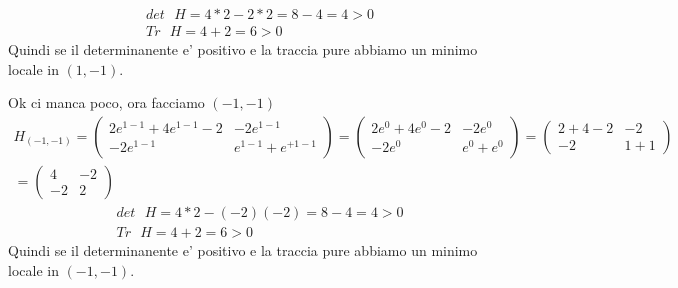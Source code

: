 \documentclass{article}
\begin{document}
\begin{align*}
    \text{$det$ $H$}= 4*2 - 2*2 = 8 - 4 = 4 >0 \\
    \text{$Tr$ $H$}=4+2=6 >0
\end{align*}
Quindi se il determinanente e' positivo e la traccia pure abbiamo un minimo locale in $(1,-1)$.


\pagebreak
Ok ci manca poco, ora facciamo $(-1,-1)$
\begin{align*}
    H_{(-1,-1)}=\begin{pmatrix}
        2e^{1-1}+4e^{1-1}-2 & -2e^{1-1} \\
        -2e^{1-1} & e^{1-1} + e^{+1-1}
    \end{pmatrix}
    = \begin{pmatrix}
            2e^{0}+4e^{0}-2 & -2e^{0} \\
            -2e^{0} & e^{0} + e^{0}
        \end{pmatrix}
    = \begin{pmatrix}
        2+4-2 & -2 \\
        -2 & 1 + 1
    \end{pmatrix} \\
    =\begin{pmatrix}
        4 & -2 \\
        -2 & 2
    \end{pmatrix}
\end{align*}
\begin{align*}
    \text{$det$ $H$}= 4*2 - (-2)(-2) = 8 - 4 = 4 >0 \\
    \text{$Tr$ $H$}=4+2=6 >0
\end{align*}
Quindi se il determinanente e' positivo e la traccia pure abbiamo un minimo locale in $(-1,-1)$.
\pagebreak
\end{document}
